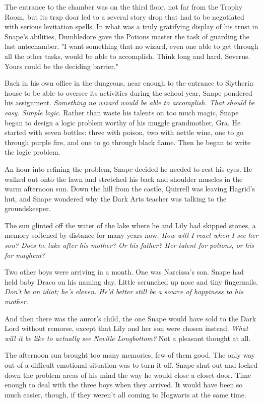 \documentclass[a4paper,11pt]{article}
\begin{document}
The entrance to the chamber was on the third floor, not far from the Trophy Room, but its trap door led to a several story drop that had to be negotiated with serious levitation spells. In what was a truly gratifying display of his trust in Snape's abilities, Dumbledore gave the Potions master the task of guarding the last antechamber. "I want something that no wizard, even one able to get through all the other tasks, would be able to accomplish. Think long and hard, Severus. Yours could be the deciding barrier."

Back in his own office in the dungeons, near enough to the entrance to Slytherin house to be able to oversee its activities during the school year, Snape pondered his assignment. \emph{Something no wizard would be able to accomplish. That should be easy. Simple logic}. Rather than waste his talents on too much magic, Snape began to design a logic problem worthy of his muggle grandmother, Gra. He started with seven bottles: three with poison, two with nettle wine, one to go through purple fire, and one to go through black flame. Then he began to write the logic problem.

An hour into refining the problem, Snape decided he needed to rest his eyes. He walked out onto the lawn and stretched his back and shoulder muscles in the warm afternoon sun. Down the hill from the castle, Quirrell was leaving Hagrid's hut, and Snape wondered why the Dark Arts teacher was talking to the groundskeeper.

The sun glinted off the water of the lake where he and Lily had skipped stones, a memory softened by distance for many years now. \emph{How will I react when I see her son? Does he take after his mother? Or his father? Her talent for potions, or his for mayhem?}

Two other boys were arriving in a month. One was Narcissa's son. Snape had held baby Draco on his naming day. Little scrunched up nose and tiny fingernails. \emph{Don't be an idiot; he's eleven. He'd better still be a source of happiness to his mother.}

And then there was the auror's child, the one Snape would have sold to the Dark Lord without remorse, except that Lily and her son were chosen instead. \emph{What will it be like to actually see Neville Longbottom?} Not a pleasant thought at all.

The afternoon sun brought too many memories, few of them good. The only way out of a difficult emotional situation was to turn it off. Snape shut out and locked down the problem areas of his mind the way he would close a closet door. Time enough to deal with the three boys when they arrived. It would have been so much easier, though, if they weren't all coming to Hogwarts at the same time.
\end{document}
